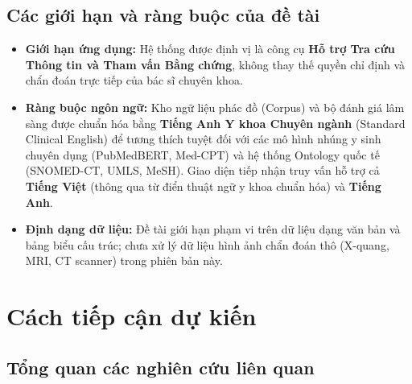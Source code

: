 \documentclass[12pt,a4paper]{article}
\begin{document}
\subsection{Các giới hạn và ràng buộc của đề tài}
\begin{itemize}[leftmargin=1.27cm]
    \item \textbf{Giới hạn ứng dụng:} Hệ thống được định vị là công cụ \textbf{Hỗ trợ Tra cứu Thông tin và Tham vấn Bằng chứng}, không thay thế quyền chỉ định và chẩn đoán trực tiếp của bác sĩ chuyên khoa.
    \item \textbf{Ràng buộc ngôn ngữ:} Kho ngữ liệu phác đồ (Corpus) và bộ đánh giá lâm sàng được chuẩn hóa bằng \textbf{Tiếng Anh Y khoa Chuyên ngành} (Standard Clinical English) để tương thích tuyệt đối với các mô hình nhúng y sinh chuyên dụng (PubMedBERT, Med-CPT) và hệ thống Ontology quốc tế (SNOMED-CT, UMLS, MeSH). Giao diện tiếp nhận truy vấn hỗ trợ cả \textbf{Tiếng Việt} (thông qua từ điển thuật ngữ y khoa chuẩn hóa) và \textbf{Tiếng Anh}.
    \item \textbf{Định dạng dữ liệu:} Đề tài giới hạn phạm vi trên dữ liệu dạng văn bản và bảng biểu cấu trúc; chưa xử lý dữ liệu hình ảnh chẩn đoán thô (X-quang, MRI, CT scanner) trong phiên bản này.
\end{itemize}

\section{Cách tiếp cận dự kiến}

\subsection{Tổng quan các nghiên cứu liên quan}
\end{document}

